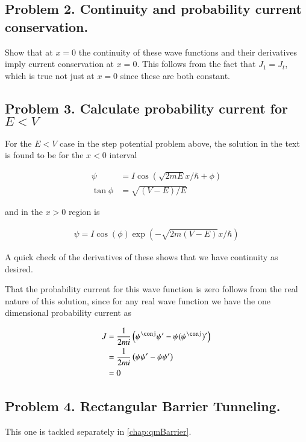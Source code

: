 \subsection{Problem 2.  Continuity and probability current conservation. }

Show that at $x=0$ the continuity of these wave functions and their derivatives 
imply current conservation at $x=0$.  This follows from the fact that $J_1 = J_t$, which is
true not just at $x=0$ since these are both constant.

\subsection{Problem 3.  Calculate probability current for $E<V$ }

For the $E<V$ case in the step potential problem above, the solution in the 
text is found to be for the $x<0$ interval

\begin{align*}
\psi &= I \cos\left( \sqrt{2mE} x/\hbar + \phi \right) \\
\tan\phi &= \sqrt{(V-E)/E}
\end{align*}

and in the $x>0$ region is

\begin{align*}
\psi = I \cos\left( \phi \right) \exp\left( -\sqrt{2m(V-E)} x/\hbar \right)
\end{align*}

A quick check of the derivatives of these shows that we have continuity as desired.

That the probability current for this wave function is zero follows from the real nature of this solution, since for any real
wave function we have the one dimensional probability current as

\begin{align*}
J 
&= \inv{2mi}\left( \psi^\conj \psi' - \psi (\psi^\conj)' \right) \\
&= \inv{2mi}\left( \psi \psi' - \psi \psi' \right) \\
&= 0
\end{align*}

\subsection{Problem 4. Rectangular Barrier Tunneling. }

This one is tackled separately in \ref{chap:qmBarrier}.

